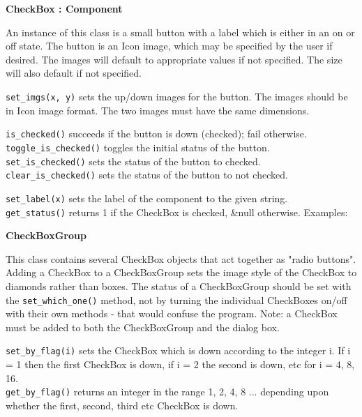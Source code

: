 {\ttfamily\bfseries
{}CheckBox : Component}

An instance of this class is a small button with a label which is either
in an on or off state. The button is an Icon image, which may be
specified by the user if desired. The images will default to
appropriate values if not specified. The size will also default if not
specified.

\texttt{set\_imgs(x, y)} sets the up/down images for the button. The images
should be in Icon image format. The two images must have the same
dimensions.

\texttt{is\_checked()} succeeds if the button is down (checked); fail
otherwise.\\
\texttt{toggle\_is\_checked()} toggles the initial status of the button.\\
\texttt{set\_is\_checked()} sets the status of the button to checked.\\
\texttt{clear\_is\_checked()} sets the status of the button to not checked.

\texttt{set\_label(x)} sets the label of the component to the given
string.\\
\texttt{get\_status()} returns 1 if the CheckBox is checked, \&null otherwise.
Examples:


{\ttfamily\bfseries
{}CheckBoxGroup}

This class contains several CheckBox objects that act together as
"radio buttons". Adding a CheckBox to a
CheckBoxGroup sets the image style of the CheckBox to diamonds rather
than boxes. The status of a CheckBoxGroup should be set with the
\texttt{set\_which\_one()} method, not by turning the individual CheckBoxes
on/off with their own methods - that would confuse the program. Note: a
CheckBox must be added to both the CheckBoxGroup and the dialog box.

\texttt{set\_by\_flag(i)} sets the CheckBox which is down according to the
integer i. If i = 1 then the first CheckBox is down, if i = 2 the
second is down, etc for i = 4, 8, 16.\\
\texttt{get\_by\_flag()} returns an integer in the range 1, 2, 4, 8 ... 
depending upon whether the first, second, third etc CheckBox is down.

